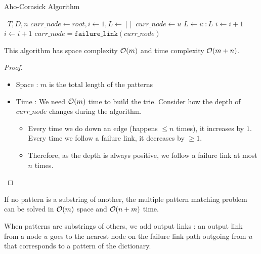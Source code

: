 \documentclass[12pt]{cours}
\begin{document}
\begin{algorithm}
    \caption{Aho-Corasick Algorithm}
    \begin{algorithmic}
        \Input \ $T, D, n$
        \EndInput
        \State $curr\_node \gets root, i \gets 1, L \gets []$
        \State $curr\_node \gets u$
        \State $L \gets i :: L$
        \EndIf
        \State $i \gets i + 1$
        \Else
        \State $i \gets i + 1$
        \Else
        \State $curr\_node = \texttt{failure\_link}(curr\_node)$
        \EndIf
        \EndIf
        \EndWhile
    \end{algorithmic}
\end{algorithm}

\begin{proposition}
    This algorithm has space complexity $\mathcal{O}(m)$ and time complexity $\mathcal{O}(m + n)$.
\end{proposition}
\begin{proof}
    \begin{itemize}
        \item Space : $m$ is the total length of the patterns
        \item Time : We need $\mathcal{O}(m)$ time to build the trie. Consider how the depth of $curr\_node$ changes during the algorithm.
              \begin{itemize}
                  \item Every time we do down an edge (happens $\leq n$ times), it increases by $1$. Every time we follow a failure link, it decreases by $\geq 1$.
                  \item Therefore, as the depth is always positive, we follow a failure link at most $n$ times.
              \end{itemize}
    \end{itemize}
\end{proof}

\begin{theorem}
    If no pattern is a substring of another, the multiple pattern matching problem can be solved in $\mathcal{O}(m)$ space and $\mathcal{O}(n + m)$ time.
\end{theorem}

\begin{definition}
    When patterns are substrings of others, we add output links : an output link from a node $u$ goes to the nearest node on the failure link path outgoing from $u$ that corresponds to a pattern of the dictionary.
\end{definition}
\end{document}
